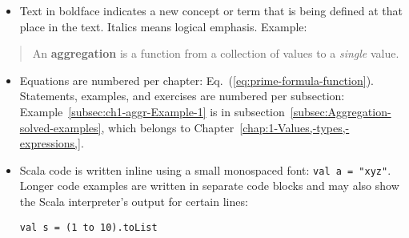 \begin{itemize}
\item Text in boldface indicates a new concept or term that is being defined
at that place in the text. Italics means logical emphasis. Example:
\end{itemize}
\begin{quotation}
An \textbf{aggregation} is a function from a collection
of values to a \emph{single} value.
\end{quotation}
\begin{itemize}
\item Equations are numbered per chapter: Eq.~(\ref{eq:prime-formula-function}).
Statements, examples, and exercises are numbered per subsection: Example~\ref{subsec:ch1-aggr-Example-1}
is in subsection~\ref{subsec:Aggregation-solved-examples}, which
belongs to Chapter~\ref{chap:1-Values,-types,-expressions,}.
\item Scala code is written inline using a small monospaced font: \lstinline!val a = "xyz"!.
Longer code examples are written in separate code blocks and may also
show the Scala interpreter\textsf{'}s output for certain lines:
\begin{lstlisting}[mathescape=true]
val s = (1 to 10).toList


\end{lstlisting}
\end{itemize}
